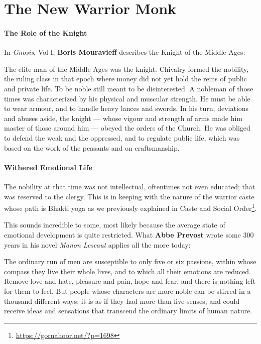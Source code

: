 \section{The New Warrior Monk}

\paragraph{The Role of the Knight}

In \emph{Gnosis}, Vol I, \textbf{Boris Mouravieff} describes the Knight of the Middle Ages:

\begin{quotex}
The elite man of the Middle Ages was the knight. Chivalry formed the nobility, the ruling class in that epoch where money did not yet hold the reins of public and private life. To be noble still meant to be disinterested. A nobleman of those times was characterized by his physical and muscular strength. He must be able to wear armour, and to handle heavy lances and swords. In his turn, deviations and abuses aside, the knight --- whose vigour and strength of arms made him master of those around him --- obeyed the orders of the Church. He was obliged to defend the weak and the oppressed, and to regulate public life, which was based on the work of the peasants and on craftsmanship.
\end{quotex}


\paragraph{Withered Emotional Life}


The nobility at that time was not intellectual, oftentimes not even educated; that was reserved to the clergy. This is in keeping with the nature of the warrior caste whose path is Bhakti yoga as we previously explained in Caste and Social Order\footnote{\url{https://gornahoor.net/?p=1698}}.

This sounds incredible to some, most likely because the average state of emotional development is quite restricted. What \textbf{Abbe Prevost} wrote some 300 years in his novel \emph{Manon Lescaut} applies all the more today:

\begin{quotex}
The ordinary run of men are susceptible to only five or six passions, within whose compass they live their whole lives, and to which all their emotions are reduced. Remove love and hate, pleasure and pain, hope and fear, and there is nothing left for them to feel. But people whose characters are more noble can be stirred in a thousand different ways; it is as if they had more than five senses, and could receive ideas and sensations that transcend the ordinary limits of human nature.
\end{quotex}


